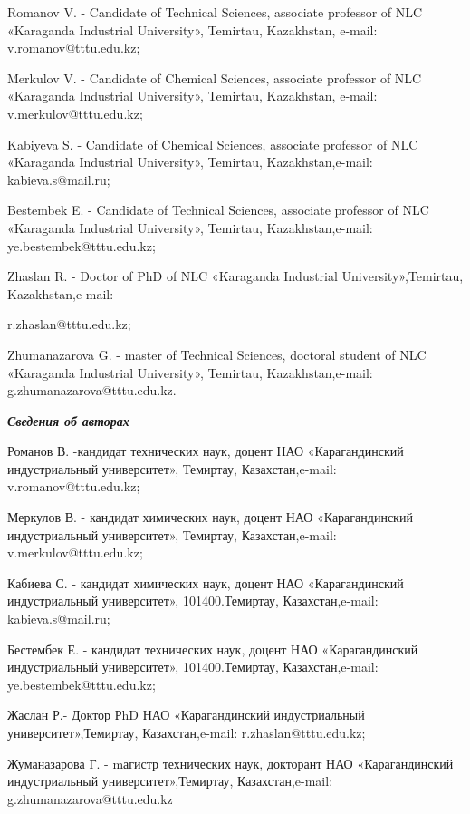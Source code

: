 \begin{noparindent}
Romanov V. - Candidate of Technical Sciences, associate professor of NLC
«Karaganda Industrial University», Temirtau, Kazakhstan, e-mail:
v.romanov@tttu.edu.kz;

Merkulov V. - Candidate of Chemical Sciences, associate professor of NLC
«Karaganda Industrial University», Temirtau, Kazakhstan, e-mail:
v.merkulov@tttu.edu.kz;

Kabiyeva S. - Candidate of Chemical Sciences, associate professor of NLC
«Karaganda Industrial University», Temirtau, Kazakhstan,e-mail:
kabieva.s@mail.ru;

Bestembek E. - Candidate of Technical Sciences, associate professor of
NLC «Karaganda Industrial University», Temirtau, Kazakhstan,e-mail:
ye.bestembek@tttu.edu.kz;

Zhaslan R. - Doctor of PhD of NLC «Karaganda Industrial
University»,Temirtau, Kazakhstan,e-mail:

r.zhaslan@tttu.edu.kz;

Zhumanazarova G. - master of Technical Sciences, doctoral student of NLC
«Karaganda Industrial University», Temirtau, Kazakhstan,e-mail:
g.zhumanazarova@tttu.edu.kz.
\end{noparindent}

\emph{{\bfseries Сведения об авторах}}

\begin{noparindent}
Романов В. -кандидат технических наук, доцент НАО «Карагандинский
индустриальный университет», Темиртау, Казахстан,e-mail:
v.romanov@tttu.edu.kz;

Меркулов В. - кандидат химических наук, доцент НАО «Карагандинский
индустриальный университет», Темиртау, Казахстан,e-mail:
v.merkulov@tttu.edu.kz;

Кабиева С. - кандидат химических наук, доцент НАО «Карагандинский
индустриальный университет», 101400.Темиртау, Казахстан,e-mail:
kabieva.s@mail.ru;

Бестембек Е. - кандидат технических наук, доцент НАО «Карагандинский
индустриальный университет», 101400.Темиртау, Казахстан,e-mail:
ye.bestembek@tttu.edu.kz;

Жаслан Р.- Доктор РhD НАО «Карагандинский индустриальный
университет»,Темиртау, Казахстан,e-mail: r.zhaslan@tttu.edu.kz;

Жуманазарова Г. - mагистр технических наук, докторант НАО
«Карагандинский индустриальный университет»,Темиртау, Казахстан,e-mail:
g.zhumanazarova@tttu.edu.kz
\end{noparindent}
